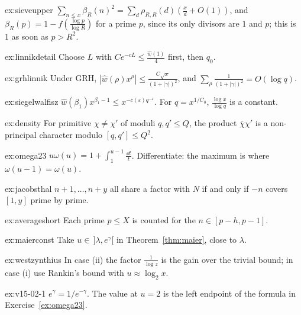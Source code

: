\begin{hint}{ex:sieveupper}
$\sum_{n\le x}\beta_R(n)^2=\sum_d\rho_{R,R}(d)(\frac xd+O(1))$, and $\beta_R(p)=1-f(\frac{\log p}{\log R})$ for a prime $p$, since its only divisors are $1$ and $p$; this is $1$ as soon as $p>R^2$.
\end{hint}
\begin{hint}{ex:linnikdetail}
Choose $L$ with $Ce^{-cL}\le\frac{\hat w(1)}4$ first, then $q_0$.
\end{hint}
\begin{hint}{ex:grhlinnik}
Under GRH, $|\hat w(\rho)x^\rho|\le\frac{C\sqrt x}{(1+|\gamma|)^2}$, and $\sum_\rho\frac1{(1+|\gamma|)^2}=O(\log q)$.
\end{hint}
\begin{hint}{ex:siegelwalfisz}
$\hat w(\beta_1)x^{\beta_1-1}\le x^{-c(\varepsilon)q^{-\varepsilon}}$. For $q=x^{1/C_0}$, $\frac{\log x}{\log q}$ is a constant.
\end{hint}
\begin{hint}{ex:density}
For primitive $\chi\ne\chi'$ of moduli $q,q'\le Q$, the product $\overline\chi\chi'$ is a non-principal character modulo $[q,q']\le Q^2$.
\end{hint}

\begin{hint}{ex:omega23}
$u\omega(u)=1+\int_1^{u-1}\frac{\dd t}t$. Differentiate: the maximum is where $\omega(u-1)=\omega(u)$.
\end{hint}
\begin{hint}{ex:jacobsthal}
$n+1,\dots,n+y$ all share a factor with $N$ if and only if $-n$ covers $[1,y]$ prime by prime.
\end{hint}
\begin{hint}{ex:averageshort}
Each prime $p\le X$ is counted for the $n\in[p-h,p-1]$.
\end{hint}
\begin{hint}{ex:maierconst}
Take $u\in\,]\lambda,e^\gamma[$ in Theorem~\ref{thm:maier}, close to $\lambda$.
\end{hint}
\begin{hint}{ex:westzynthius}
In case (ii) the factor $\frac1{\log z}$ is the gain over the trivial bound; in case (i) use Rankin's bound with $u\approx\log_2x$.
\end{hint}

\begin{hint}{ex:v15-02-1}
\(e^{\gamma}=1/e^{-\gamma}\). The value at \(u=2\) is the left endpoint of the formula in Exercise~\ref{ex:omega23}.
\end{hint}

